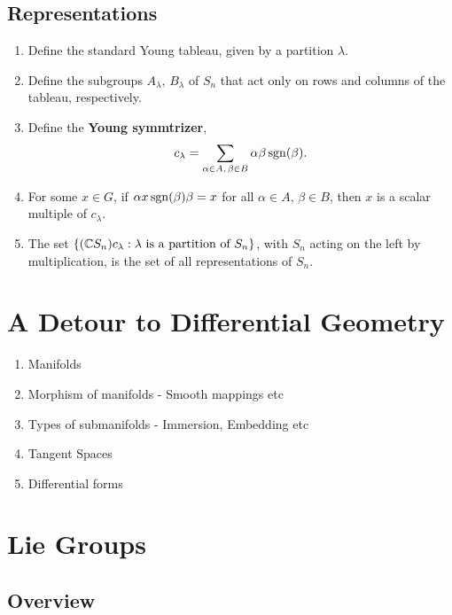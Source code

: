 \section{Representations}


\begin{enumerate}
    \makethislistcompact
    \item Define the standard Young tableau, given by a partition $\lambda$.
    \item Define the subgroups $A_\lambda,\, B_\lambda$ of $S_n$ that act only on rows and columns of the tableau, respectively.
    \item Define the \textbf{Young symmtrizer},
        \begin{align}
            c_\lambda = \sum_{\substack{\alpha\in A,\, \beta\in B}} \alpha \beta \operatorname{sgn}(\beta).
        \end{align}
    \item For some $x\in G$, if $\alpha x \operatorname{sgn}(\beta)\beta = x$ for all $\alpha\in A,\, \beta\in B$, then $x$ is a scalar multiple of $c_\lambda$.
    \item The set $\{(\mathbb{C} S_n )c_\lambda : \lambda \text{ is a partition of } S_n\}$, with $S_n$ acting on the left by multiplication, is the set of all representations of $S_n$.
\end{enumerate}


\chapter{A Detour to Differential Geometry}
\label{cha:a_small_detour_to_differential_geometry}

\begin{enumerate}
    \makethislistcompact
    \item Manifolds
    \item Morphism of manifolds -  Smooth mappings etc
    \item Types of submanifolds - Immersion, Embedding etc
    \item Tangent Spaces
    \item Differential forms
\end{enumerate}




\chapter{Lie Groups}
\label{cha:lie_groups}

\section{Overview}
\label{sec:overview}

